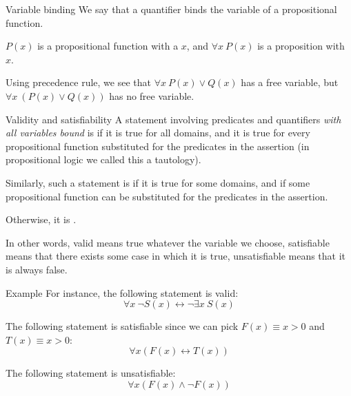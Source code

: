 \documentclass{article}
\begin{document}
\begin{parag}{Variable binding}
    We say that a quantifier binds the variable of a propositional function.

    $P\left(x\right)$ is a propositional function with a  $x$, and $\forall x\ P\left(x\right)$ is a proposition with  $x$.

    Using precedence rule, we see that $\forall x\ P\left(x\right) \lor Q\left(x\right)$ has a free variable, but $\forall x\ \left(P\left(x\right) \lor Q\left(x\right)\right)$ has no free variable.
\end{parag}

\begin{parag}{Validity and satisfiability}
    A statement involving predicates and quantifiers \textit{with all variables bound} is  if it is true for all domains, and it is true for every propositional function substituted for the predicates in the assertion (in propositional logic we called this a tautology). 

    Similarly, such a statement is  if it is true for some domains, and if some propositional function can be substituted for the predicates in the assertion.

    Otherwise, it is .

    In other words, valid means true whatever the variable we choose, satisfiable means that there exists some case in which it is true, unsatisfiable means that it is always false.
\end{parag}

\begin{parag}{Example}
    For instance, the following statement is valid: 
    \[\forall x\ \lnot S\left(x\right) \leftrightarrow \lnot \exists x\ S\left(x\right)\]
    
    The following statement is satisfiable since we can pick $F\left(x\right) \equiv x > 0$ and $T\left(x\right) \equiv x > 0$: 
    \[\forall x\left(F\left(x\right) \leftrightarrow T\left(x\right)\right)\]
    
    The following statement is unsatisfiable: 
    \[\forall x\left(F\left(x\right) \land \lnot F\left(x\right)\right)\]
\end{parag}
\end{document}
